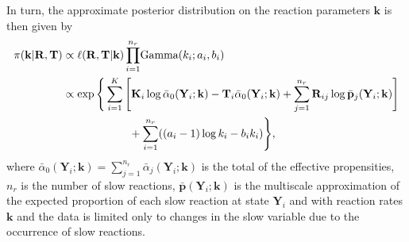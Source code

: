 In turn, the approximate posterior distribution on the reaction
parameters $\mathbf{k}$ is then given by
\begin{align}
	\pi(\mathbf{k}|\mathbf{R}, \mathbf{T}) &\propto \ell(\mathbf{R}, \mathbf{T}|\mathbf{k})
	\prod_{i=1}^{n_r} \! \text{Gamma}(k_i; a_i, b_i) \notag \\
		&\propto \exp\Bigg\{\sum\limits_{i=1}^K \Bigg[
				\mathbf{K}_i\log
                  \bar{\alpha}_0(\mathbf{Y}_i; \mathbf{k}) -
                  \mathbf{T}_i \bar{\alpha}_0(\mathbf{Y}_i; \mathbf{k}) %
				+\sum_{j=1}^{n_r} \mathbf{R}_{ij}\log \bar{\mathbf{p}}_j(\mathbf{Y}_i; \mathbf{k})
			\Bigg]  \notag\\
		&	\qquad\qquad\qquad{} + \sum_{i=1}^{n_r} ((a_i-1)\log k_i - b_ik_i)\Bigg\}, \label{eq:Apos}
\end{align}
where $\bar{\alpha}_0(\mathbf{Y}_i; \mathbf{k}) = \sum_{j=1}^{n_r}
\bar{\alpha}_j(\mathbf{Y}_i; \mathbf{k})$ is the total of the
effective propensities, $n_r$ is the number of slow reactions,
$\bar{\mathbf{p}}(\mathbf{Y}_i; \mathbf{k})$ is the multiscale
approximation of the expected proportion of each slow reaction at
state $\mathbf{Y}_i$ and with reaction rates $\mathbf{k}$ and the
data is limited only to changes in the slow variable due to the
occurrence of slow reactions.
